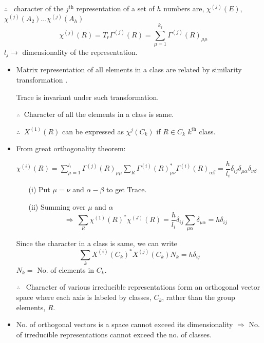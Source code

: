 $\therefore$ \ character of the $j^{\text{th}}$ representation of a set of $h$ numbers are, $\chi^{(j)}(E)$, $\chi^{(j)}(A_{2})\ldots \chi^{(j)}(A_{h})$
$$
\chi^{(j)}(R)=T_{r}\Gamma^{(j)}(R)=\sum\limits^{k_{j}}_{\mu=1}\Gamma^{(j)}(R)_{\mu\mu}
$$
$l_{j} \to$ dimensionality of the representation.
\begin{itemize}
\item Matrix representation of all elements in a class are related by similarity transformation .

Trace is invariant under such transformation.

$\therefore \ $ Character of all the elements in a class is same.

$\therefore \ $ $X^{(1)}(R)$ can be expressed as $\chi^{j}(C_{k})$ if $R\in C_{k}$ $k^{\text{th}}$ class.

\item From great orthogonality theorem:

$\chi^{(i)}(R)=\sum\limits^{l_{i}}_{\mu=1}\Gamma^{(j)}(R)_{\mu\mu}\sum\limits_{R}\Gamma^{(i)}(R)^{*}_{\mu\nu}\Gamma^{(i)}(R)_{\alpha\beta}=\dfrac{h}{l_{i}}\delta_{ij}\delta_{\mu\alpha}\delta_{\nu\beta}$ 
\begin{itemize}
\item[(i)] Put $\mu=\nu$ and $\alpha-\beta$ to get Trace.

\item[(ii)] Summing over $\mu$ and $\alpha$
$$
\Rightarrow \ \sum\limits_{R}\chi^{(1)}(R)^{*}\chi^{(J)}(R)=\dfrac{h}{l_{i}}\delta_{ij}\sum\limits_{\mu\alpha}\delta_{\mu\alpha}=h\delta_{ij}
$$
\end{itemize}
Since the character in a class is same, we can write
\begin{equation*}
\sum\limits_{k}X^{(i)}(C_{k})^{*}X^{(j)}(C_{k})N_{k}=h\delta_{ij}\tag{A}\label{lec7-eqA}
\end{equation*}
$N_{k}=$ No. of elements in $C_{k}$.

$\therefore$ \ Character of various irreducible representations form an orthogonal vector space where each axis is labeled by classes, $C_{k}$, rather than the group elements, $R$.

\item No. of orthogonal vectors is a space cannot exceed its dimensionality $\Rightarrow$ No. of irreducible representations cannot exceed the no. of classes.
\end{itemize}


